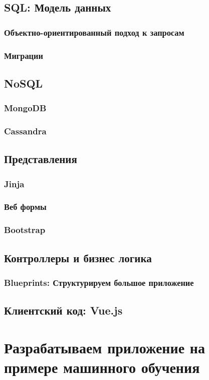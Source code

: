 \section{SQL: Модель данных}

\subsection{Объектно-ориентированный подход к запросам}

\subsection{Миграции}

\section{NoSQL}

\subsection{MongoDB}

\subsection{Cassandra}

\section{Представления}

\subsection{Jinja}

\subsection{Веб формы}

\subsection{Bootstrap}

\section{Контроллеры и бизнес логика}

\subsection{Blueprints: Структурируем большое приложение}

\section{Клиентский код: Vue.js}

\chapter{Разрабатываем приложение на примере машинного обучения}

